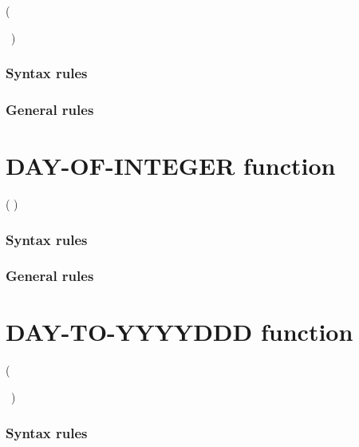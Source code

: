 \begin{syntax}
    (
  \argument
  \begin{0-1}
    \argument
    \begin{0-1}
      \argument
    \end{0-1}
  \end{0-1}
  \ {})
\end{syntax}

\subsubsection{Syntax rules}

\subsubsection{General rules}

\section{DAY-OF-INTEGER function}

\begin{syntax}
    ( \argument )
\end{syntax}

\subsubsection{Syntax rules}

\subsubsection{General rules}

\section{DAY-TO-YYYYDDD function}

\begin{syntax}
    (
  \argument
  \begin{0-1}
    \argument
    \begin{0-1}
      \argument
    \end{0-1}
  \end{0-1}
  \ {})
\end{syntax}

\subsubsection{Syntax rules}

